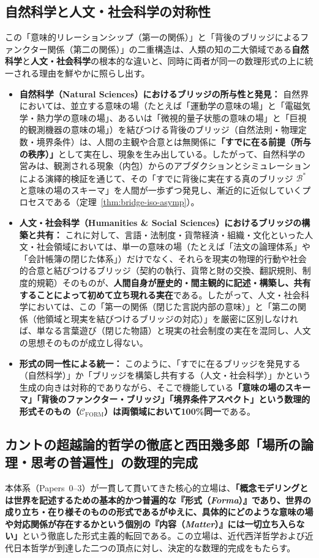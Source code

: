\documentclass[11pt,a4paper]{ltjsarticle}
\theoremstyle{definition}
\theoremstyle{plain}
\theoremstyle{remark}
\newcommand{\CFORM}{\mathcal{C}_{\mathrm{FORM}}}
\begin{document}
\subsection{自然科学と人文・社会科学の対称性}
この「意味的リレーションシップ（第一の関係）」と「背後のブリッジによるファンクター関係（第二の関係）」の二重構造は、人類の知の二大領域である\textbf{自然科学}と\textbf{人文・社会科学}の根本的な違いと、同時に両者が同一の数理形式の上に統一される理由を鮮やかに照らし出す。

\begin{itemize}
    \item \textbf{自然科学（Natural Sciences）におけるブリッジの所与性と発見：}
    自然界においては、並立する意味の場（たとえば「運動学の意味の場」と「電磁気学・熱力学の意味の場」、あるいは「微視的量子状態の意味の場」と「巨視的観測機器の意味の場」）を結びつける背後のブリッジ（自然法則・物理定数・境界条件）は、人間の主観や合意とは無関係に\textbf{「すでに在る前提（所与の秩序）」}として実在し、現象を生み出している。したがって、自然科学の営みは、観測される現象（内包）からのアブダクションとシミュレーションによる演繹的検証を通じて、その「すでに背後に実在する真のブリッジ $\mathcal{B}^*$ と意味の場のスキーマ」を人間が一歩ずつ発見し、漸近的に近似していくプロセスである（定理~\ref{thm:bridge-iso-asymp}）。
    \item \textbf{人文・社会科学（Humanities \& Social Sciences）におけるブリッジの構築と共有：}
    これに対して、言語・法制度・貨幣経済・組織・文化といった人文・社会領域においては、単一の意味の場（たとえば「法文の論理体系」や「会計帳簿の閉じた体系」）だけでなく、それらを現実の物理的行動や社会的合意と結びつけるブリッジ（契約の執行、貨幣と財の交換、翻訳規則、制度的規範）そのものが、\textbf{人間自身が歴史的・間主観的に記述・構築し、共有することによって初めて立ち現れる実在}である。したがって、人文・社会科学においては、この「第一の関係（閉じた言説内部の意味）」と「第二の関係（他領域と現実を結びつけるブリッジの対応）」を厳密に区別しなければ、単なる言葉遊び（閉じた物語）と現実の社会制度の実在を混同し、人文の思想そのものが成立し得ない。
    \item \textbf{形式の同一性による統一：}
    このように、「すでに在るブリッジを発見する（自然科学）」か「ブリッジを構築し共有する（人文・社会科学）」かという生成の向きは対称的でありながら、そこで機能している\textbf{「意味の場のスキーマ」「背後のファンクター・ブリッジ」「境界条件アスペクト」という数理的形式そのもの（$\CFORM$）は両領域において100\%同一}である。
\end{itemize}

\subsection{カントの超越論的哲学の徹底と西田幾多郎「場所の論理・思考の普遍性」の数理的完成}
本体系（Papers~0--3）が一貫して貫いてきた核心的立場は、\textbf{「概念モデリングとは世界を記述するための基本的かつ普遍的な『形式（\emph{Forma}）』であり、世界の成り立ち・在り様そのものの形式であるがゆえに、具体的にどのような意味の場や対応関係が存在するかという個別の『内容（\emph{Matter}）』には一切立ち入らない」}という徹底した形式主義的転回である。この立場は、近代西洋哲学および近代日本哲学が到達した二つの頂点に対し、決定的な数理的完成をもたらす。
\end{document}
